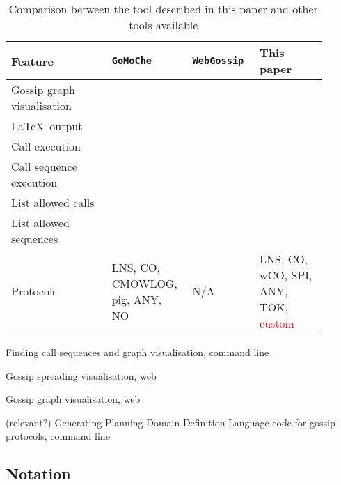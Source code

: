 \begin{table*}
    \centering
    \caption{Comparison between the tool described in this paper and other tools available}
    \label{tab:tool-comparison}
    \begin{tabular}{@{}p{0.3\linewidth}*{3}{M{0.2\linewidth}}@{}}
        \toprule
        Feature 
            & \texttt{GoMoChe} 
            & \texttt{WebGossip} 
            & This paper\\
        \midrule
        Gossip graph visualisation
            & 
            & 
            & 
            \\
        \LaTeX\ output
            & 
            & 
            & 
            \\
        Call execution
            & 
            & 
            & 
            \\
        Call sequence execution
            & 
            & 
            & 
            \\
        List allowed calls
            & 
            & 
            & 
            \\
        List allowed sequences
            & 
            & 
            & 
            \\
        Protocols
            & LNS, CO, CMOWLOG, pig, ANY, NO
            & N/A
            & LNS, CO, wCO, SPI, ANY, TOK, \textcolor{red}{custom}
            \\
        \bottomrule
    \end{tabular}
\end{table*}

Finding call sequences and graph visualisation, command line \parencite{gattinger_m4lvingomoche_2020}

Gossip spreading visualisation, web \parencite{moelker_rrmoelkergossip-visualization_2016}

Gossip graph visualisation, web \parencite{gattinger_webgossip_nodate}

(relevant?) Generating Planning Domain Definition Language code for gossip protocols, command line \parencite{maffre_faustinemaffregossipproblem-pddl-generator_2020}

\subsection{Notation}
\label{sec:notation}

